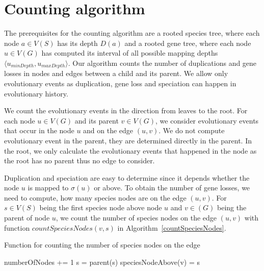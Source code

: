 
\section{Counting algorithm}

The prerequisites for the counting algorithm are a rooted species tree, where each node $a \in V(S)$ has its depth $D(a)$ and a rooted gene tree, where each node $u \in V(G)$ has computed its interval of all possible mapping depths $\langle u_{minDepth}, u_{maxDepth}\rangle$. Our algorithm counts the number of duplications and gene losses in nodes and edges between a child and its parent. We allow only evolutionary events as duplication, gene loss and speciation can happen in evolutionary history.

We count the evolutionary events in the direction from leaves to the root. For each node $u \in V(G)$ and its parent $v \in V(G)$, we consider evolutionary events that occur in the node $u$ and on the edge $(u, v)$. We do not compute evolutionary event in the parent, they are determined directly in the parent. In the root, we only calculate the evolutionary events that happened in the node as the root has no parent thus no edge to consider.

Duplication and speciation are easy to determine since it depends whether the node $u$ is mapped to $\sigma(u)$ or above. To obtain the number of gene losses, we need to compute, how many species nodes are on the edge $(u, v)$. For $s \in V(S)$ being the first species node above node $u$ and $v \in (G)$ being the parent of node $u$, we count the number of species nodes on the edge $(u, v)$ with function $countSpeciesNodes(v, s)$ in Algorithm~\ref{countSpeciesNodes}.

\begin{algorithm}
\caption{Function for counting the number of species nodes on the edge} 
\label{countSpeciesNodes}
\begin{algorithmic}[1]
		\State numberOfNodes += 1
		\State s = parent(s)
	\EndWhile
	\State speciesNodeAbove(v) = s \\
\EndFunction
\end{algorithmic}
\end{algorithm}


